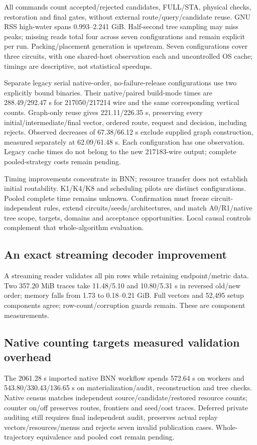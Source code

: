 \documentclass[conference,10pt]{IEEEtran}
\begin{document}
All commands count accepted/rejected candidates, FULL/STA, physical checks, restoration and final gates, without external route/query/candidate reuse. GNU RSS high-water spans 0.993--2.241 GiB. Half-second tree sampling may miss peaks; missing reads total four across seven configurations and remain explicit per run. Packing/placement generation is upstream. Seven configurations cover three circuits, with one shared-host observation each and uncontrolled OS cache; timings are descriptive, not statistical speedups.

Separate legacy serial native-order, no-failure-release configurations use two explicitly bound binaries. Their native/paired build-mode times are 288.49/292.47 s for 217050/217214 wire and the same corresponding vertical counts. Graph-only reuse gives 221.11/226.35 s, preserving every initial/intermediate/final vector, ordered route, request and decision, including rejects. Observed decreases of 67.38/66.12 s exclude supplied graph construction, measured separately at 62.09/61.48 s. Each configuration has one observation. Legacy cache times do not belong to the new 217183-wire output; complete pooled-strategy costs remain pending.

Timing improvements concentrate in BNN; resource transfer does not establish initial routability. K1/K4/K8 and scheduling pilots are distinct configurations. Pooled complete time remains unknown. Confirmation must freeze circuit-independent rules, extend circuits/seeds/architectures, and match A0/R1/native tree scope, targets, domains and acceptance opportunities. Local causal controls complement that whole-algorithm evaluation.

\subsection{An exact streaming decoder improvement}
A streaming reader validates all pin rows while retaining endpoint/metric data. Two 357.20 MiB traces take 11.48/5.10 and 10.80/5.31 s in reversed old/new order; memory falls from 1.73 to 0.18--0.21 GiB. Full vectors and 52,495 setup components agree; row-count/corruption guards remain. These are component measurements.

\subsection{Native counting targets measured validation overhead}
The 2061.28 s imported native BNN workflow spends 572.64 s on workers and 543.80/330.43/136.65 s on materialization/audit, reconstruction and tree checks. Native census matches independent source/candidate/restored resource counts; counter on/off preserves routes, frontiers and seed/cost traces. Deferred private auditing still requires final independent audit, preserves actual replay vectors/resources/menus and rejects seven invalid publication cases. Whole-trajectory equivalence and pooled cost remain pending.
\end{document}

